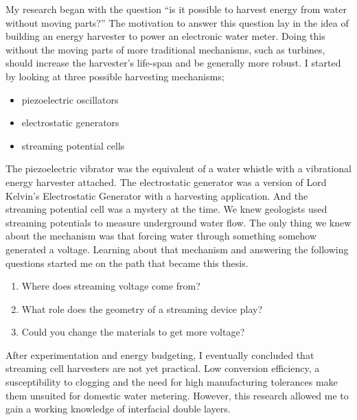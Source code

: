   My research began with the question ``is it possible to harvest energy from water without moving parts?''
  The motivation to answer this question lay in the idea of building an energy harvester to power an electronic water meter.
  Doing this without the moving parts of more traditional mechanisms, such as turbines, should increase the harvester's life-span and be generally more robust.
  I started by looking at three possible harvesting mechanisms;
  \begin{itemize}
    \item piezoelectric oscillators
    \item electrostatic generators
    \item streaming potential cells
  \end{itemize}
  The piezoelectric vibrator was the equivalent of a water whistle with a vibrational energy harvester attached.
  The electrostatic generator was a version of Lord Kelvin's Electrostatic Generator with a harvesting application.
  And the streaming potential cell was a mystery at the time.
  We knew geologists used streaming potentials to measure underground water flow.
  The only thing we knew about the mechanism was that forcing water through something somehow generated a voltage.
  Learning about that mechanism and answering the following questions started me on the path that became this thesis.
  \begin{enumerate}
    \item Where does streaming voltage come from?
    \item What role does the geometry of a streaming device play?
    \item Could you change the materials to get more voltage?
  \end{enumerate}
  After experimentation and energy budgeting, I eventually concluded that streaming cell harvesters are not yet practical.
  Low conversion efficiency, a susceptibility to clogging and the need for high manufacturing tolerances make them unsuited for domestic water metering.
  However, this research allowed me to gain  a working knowledge of interfacial double layers.

